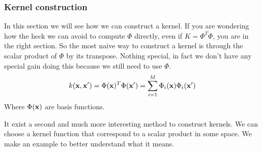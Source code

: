 \documentclass[main.tex]{subfiles}
\begin{document}
\subsubsection{Kernel construction}
In this section we will see how we can construct a kernel. If you are wondering how the heck we can avoid to compute $\Phi$ directly, even if $K=\Phi^T \Phi$, you are in the right section.
So the most naive way to construct a kernel is through the scalar product of $\Phi$ by its transpose. Nothing special, in fact we don't have any special gain doing this because we still need to use $\Phi$.
\begin{equation*}
    k(\textbf{x},\textbf{x}') = \Phi(\textbf{x})^T \Phi(\textbf{x}') = \sum_{i=1}^M \Phi_i(\textbf{x}) \Phi_i(\textbf{x}')
\end{equation*}
Where $\Phi(\textbf{x})$ are basis functions.

It exist a second and much more interesting method to construct kernels. We can choose a kernel function that correspond to a scalar product in some space. We make an example to better understand what it means.
\end{document}
